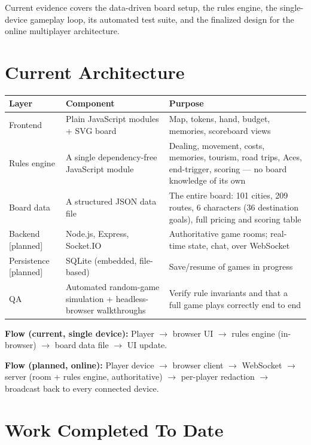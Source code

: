 \documentclass[11pt]{article}
\newcommand{\bracket}[1]{\textcolor{gray!70!black}{[#1]}}
\begin{document}
Current evidence covers the data-driven board setup, the rules engine, the single-device gameplay loop, its automated test suite, and the finalized design for the online multiplayer architecture.

\section{Current Architecture}

\begin{tabularx}{\textwidth}{@{} l l Y @{}}
  \toprule
  \textbf{Layer} & \textbf{Component} & \textbf{Purpose} \\
  \midrule
  Frontend & Plain JavaScript modules + SVG board & Map, tokens, hand, budget, memories, scoreboard views \\
  Rules engine & A single dependency-free JavaScript module & Dealing, movement, costs, memories, tourism, road trips, Aces, end-trigger, scoring --- no board knowledge of its own \\
  Board data & A structured JSON data file & The entire board: 101 cities, 209 routes, 6 characters (36 destination goals), full pricing and scoring table \\
  Backend \bracket{planned} & Node.js, Express, Socket.IO & Authoritative game rooms; real-time state, chat, over WebSocket \\
  Persistence \bracket{planned} & SQLite (embedded, file-based) & Save/resume of games in progress \\
  QA & Automated random-game simulation + headless-browser walkthroughs & Verify rule invariants and that a full game plays correctly end to end \\
  \bottomrule
\end{tabularx}

\textbf{Flow (current, single device):} Player $\rightarrow$ browser UI $\rightarrow$ rules engine (in-browser) $\rightarrow$ board data file $\rightarrow$ UI update.

\textbf{Flow (planned, online):} Player device $\rightarrow$ browser client $\rightarrow$ WebSocket $\rightarrow$ server (room + rules engine, authoritative) $\rightarrow$ per-player redaction $\rightarrow$ broadcast back to every connected device.

\section{Work Completed To Date}
\end{document}
